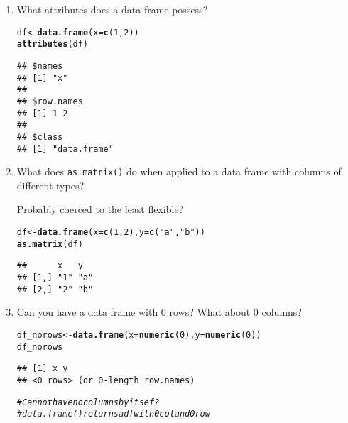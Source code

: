 \documentclass{article}\usepackage[]{graphicx}\usepackage[]{color}
\makeatletter
\newcommand{\hlnum}[1]{\textcolor[rgb]{0.686,0.059,0.569}{#1}}%
\newcommand{\hlstr}[1]{\textcolor[rgb]{0.192,0.494,0.8}{#1}}%
\newcommand{\hlcom}[1]{\textcolor[rgb]{0.678,0.584,0.686}{\textit{#1}}}%
\newcommand{\hlstd}[1]{\textcolor[rgb]{0.345,0.345,0.345}{#1}}%
\newcommand{\hlkwb}[1]{\textcolor[rgb]{0.69,0.353,0.396}{#1}}%
\newcommand{\hlkwc}[1]{\textcolor[rgb]{0.333,0.667,0.333}{#1}}%
\newcommand{\hlkwd}[1]{\textcolor[rgb]{0.737,0.353,0.396}{\textbf{#1}}}%
\newenvironment{kframe}{%
 \def\at@end@of@kframe{}%
 \ifinner\ifhmode%
  \def\at@end@of@kframe{\end{minipage}}%
  \begin{minipage}{\columnwidth}%
 \fi\fi%
 \def\FrameCommand##1{\hskip\@totalleftmargin \hskip-\fboxsep
 \colorbox{shadecolor}{##1}\hskip-\fboxsep
     \hskip-\linewidth \hskip-\@totalleftmargin \hskip\columnwidth}%
 \MakeFramed {\advance\hsize-\width
   \@totalleftmargin\z@ \linewidth\hsize
   \@setminipage}}%
 {\par\unskip\endMakeFramed%
 \at@end@of@kframe}
\newenvironment{knitrout}{}{} %
\makeatother
\begin{document}
\begin{enumerate}
\item What attributes does a data frame possess?

\begin{knitrout}
\color{fgcolor}\begin{kframe}
\begin{alltt}
\hlstd{df} \hlkwb{<-} \hlkwd{data.frame}\hlstd{(}\hlkwc{x} \hlstd{=} \hlkwd{c}\hlstd{(}\hlnum{1}\hlstd{,}\hlnum{2}\hlstd{))}
\hlkwd{attributes}\hlstd{(df)}
\end{alltt}
\begin{verbatim}
## $names
## [1] "x"
## 
## $row.names
## [1] 1 2
## 
## $class
## [1] "data.frame"
\end{verbatim}
\end{kframe}
\end{knitrout}

\item What does \verb`as.matrix()` do when applied to a data frame with columns of different types?

Probably coerced to the least flexible?

\begin{knitrout}
\color{fgcolor}\begin{kframe}
\begin{alltt}
\hlstd{df} \hlkwb{<-} \hlkwd{data.frame}\hlstd{(}\hlkwc{x} \hlstd{=} \hlkwd{c}\hlstd{(}\hlnum{1}\hlstd{,}\hlnum{2}\hlstd{),} \hlkwc{y}\hlstd{=}\hlkwd{c}\hlstd{(}\hlstr{"a"}\hlstd{,} \hlstr{"b"}\hlstd{))}
\hlkwd{as.matrix}\hlstd{(df)}
\end{alltt}
\begin{verbatim}
##      x   y  
## [1,] "1" "a"
## [2,] "2" "b"
\end{verbatim}
\end{kframe}
\end{knitrout}


\item Can you have a data frame with 0 rows? What about 0 columns?

\begin{knitrout}
\color{fgcolor}\begin{kframe}
\begin{alltt}
\hlstd{df_norows} \hlkwb{<-} \hlkwd{data.frame}\hlstd{(}\hlkwc{x}\hlstd{=}\hlkwd{numeric}\hlstd{(}\hlnum{0}\hlstd{),} \hlkwc{y}\hlstd{=}\hlkwd{numeric}\hlstd{(}\hlnum{0}\hlstd{))}
\hlstd{df_norows}
\end{alltt}
\begin{verbatim}
## [1] x y
## <0 rows> (or 0-length row.names)
\end{verbatim}
\begin{alltt}
\hlcom{# Cannot have no columns by itsef?}
\hlcom{# data.frame() returns a df with 0 col and 0 row}
\end{alltt}
\end{kframe}
\end{knitrout}

\end{enumerate}
\end{document}
